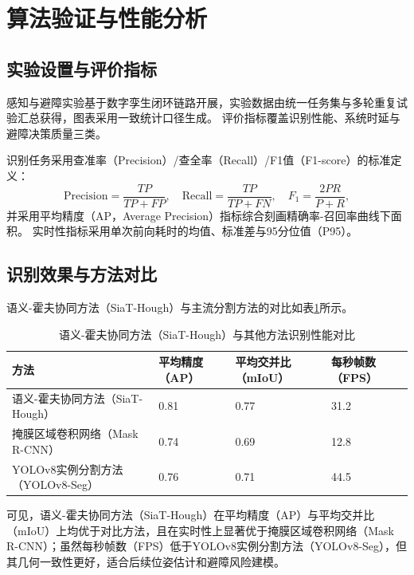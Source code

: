 \documentclass[UTF8,zihao=-4,a4paper,oneside,openany]{ctexrep}
\numberwithin{equation}{chapter}
\renewcommand{\small}{\normalsize}
\renewcommand{\small}{\normalsize}
\theoremstyle{plain}
\theoremstyle{definition}
\begin{document}
\section{算法验证与性能分析}
\label{sec:ch5_validation}

\subsection{实验设置与评价指标}
\label{subsec:ch5_eval_setup}

感知与避障实验基于数字孪生闭环链路开展，实验数据由统一任务集与多轮重复试验汇总获得，图表采用一致统计口径生成。
评价指标覆盖识别性能、系统时延与避障决策质量三类。

识别任务采用查准率（Precision）/查全率（Recall）/F1值（F1-score）的标准定义：
\begin{equation}
\mathrm{Precision}=\frac{TP}{TP+FP},\quad
\mathrm{Recall}=\frac{TP}{TP+FN},\quad
F_1=\frac{2PR}{P+R},
\label{eq:ch5_prf}
\end{equation}
并采用平均精度（AP，Average Precision）指标综合刻画精确率-召回率曲线下面积。
实时性指标采用单次前向耗时的均值、标准差与95分位值（P95）。

\subsection{识别效果与方法对比}
\label{subsec:ch5_detection_compare}

语义-霍夫协同方法（SiaT-Hough）与主流分割方法的对比如表\ref{tab:ch5_method_compare}所示。

\begin{table}[H]
	\centering
	\small
	\caption{语义-霍夫协同方法（SiaT-Hough）与其他方法识别性能对比}
	\label{tab:ch5_method_compare}
	\begin{tabular}{p{}p{}p{}p{}}
		\toprule
		方法 & 平均精度（AP） & 平均交并比（mIoU） & 每秒帧数（FPS） \\
		\midrule
		语义-霍夫协同方法（SiaT-Hough） & 0.81 & 0.77 & 31.2 \\
		掩膜区域卷积网络（Mask R-CNN） & 0.74 & 0.69 & 12.8 \\
		YOLOv8实例分割方法（YOLOv8-Seg） & 0.76 & 0.71 & 44.5 \\
		\bottomrule
	\end{tabular}
\end{table}

可见，语义-霍夫协同方法（SiaT-Hough）在平均精度（AP）与平均交并比（mIoU）上均优于对比方法，且在实时性上显著优于掩膜区域卷积网络（Mask R-CNN）；虽然每秒帧数（FPS）低于YOLOv8实例分割方法（YOLOv8-Seg），但其几何一致性更好，适合后续位姿估计和避障风险建模。
\end{document}
